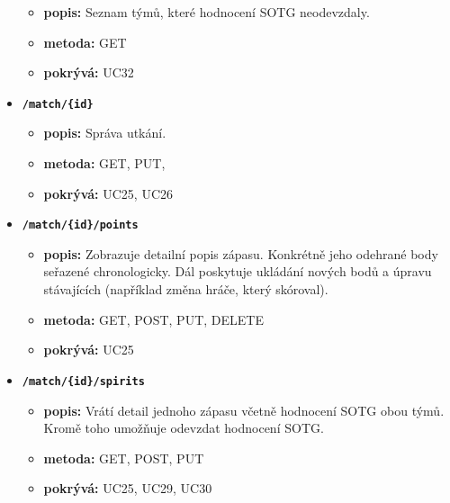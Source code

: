 \begin{itemize}
  \begin{itemize}
    \item \textbf{popis:} Seznam týmů, které hodnocení SOTG neodevzdaly.
    \item \textbf{metoda:} GET
    \item \textbf{pokrývá:} UC32
  \end{itemize}
  \item \texttt{\textbf{/match/\{id\}}}
  \begin{itemize}
    \item \textbf{popis:} Správa utkání.
    \item \textbf{metoda:} GET, PUT, 
    \item \textbf{pokrývá:} UC25, UC26
  \end{itemize}
  \pagebreak
  \item \texttt{\textbf{/match/\{id\}/points}}
  \begin{itemize}
    \item \textbf{popis:} Zobrazuje detailní popis zápasu. Konkrétně jeho odehrané body seřazené chronologicky.
      Dál poskytuje ukládání nových bodů a úpravu stávajících (například změna hráče, který skóroval).
    \item \textbf{metoda:} GET, POST, PUT, DELETE
    \item \textbf{pokrývá:} UC25
  \end{itemize}
  \item \texttt{\textbf{/match/\{id\}/spirits}}
  \begin{itemize}
    \item \textbf{popis:} Vrátí detail jednoho zápasu včetně hodnocení SOTG obou týmů. Kromě toho umožňuje odevzdat hodnocení SOTG.
    \item \textbf{metoda:} GET, POST, PUT
    \item \textbf{pokrývá:} UC25, UC29, UC30
  \end{itemize}
\end{itemize}